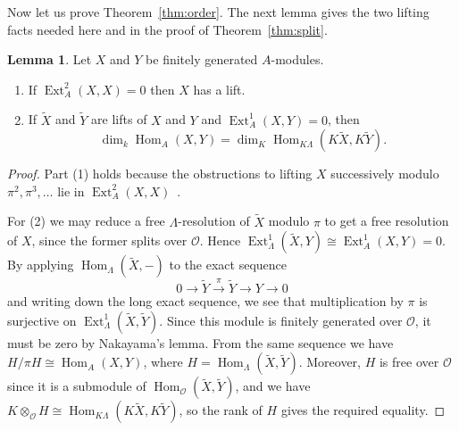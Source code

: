 \documentclass[11pt,a4paper,reqno]{amsart}
\newcommand{\kk}{k}
\theoremstyle{definition}
\newtheorem{lemma}[theorem]{Lemma}
\DeclareMathOperator{\Hom}{Hom}
\DeclareMathOperator{\Ext}{Ext}
\newcommand{\OO}{\mathcal O}
\newcommand{\tight}{\setlength{\itemsep}{0pt}\setlength{\parsep}{0pt}}
\begin{document}
Now let us prove Theorem~\ref{thm:order}.  The next lemma gives the
two lifting facts needed here and in the proof of
Theorem~\ref{thm:split}.

\begin{lemma}\label{lem:lift}
  Let $X$ and $Y$ be finitely generated $A$-modules.
  \begin{enumerate}\tight
  \item If $\Ext_{A}^{2}(X,X)=0$ then $X$ has a lift.
  \item If $\widetilde X$ and $\widetilde Y$ are lifts of $X$ and $Y$
    and $\Ext_{A}^{1}(X,Y)=0$, then
    \begin{equation*}
      \dim_{\kk}\Hom_{A}(X,Y)=\dim_{K}\Hom_{K\Lambda}(K\widetilde X,K\widetilde Y).
    \end{equation*}
  \end{enumerate}
\end{lemma}
\begin{proof}
  Part (1) holds because the obstructions to lifting $X$ successively
  modulo $\pi^{2},\pi^{3},\ldots$ lie in
  $\Ext_{A}^{2}(X,X)$~\cite[Proposition 1.6]{ADS}.

  For (2) we may reduce a free $\Lambda$-resolution of $\widetilde X$
  modulo $\pi$ to get a free resolution of $X$, since the former
  splits over $\OO$.  Hence
  $\Ext_{\Lambda}^{1}(\widetilde X,Y)\cong\Ext_{A}^{1}(X,Y)=0$.  By
  applying $\Hom_{\Lambda}(\widetilde X,-)$ to the exact sequence
  \begin{equation*}
    0\longrightarrow\widetilde Y\xrightarrow{\ \pi\ }\widetilde Y\longrightarrow Y\longrightarrow0
  \end{equation*}
  and writing down the long exact sequence, we see that multiplication
  by $\pi$ is surjective on
  $\Ext_{\Lambda}^{1}(\widetilde X,\widetilde Y)$.  Since this module
  is finitely generated over $\OO$, it must be zero by Nakayama's
  lemma.  From the same sequence we have $H/\pi H\cong\Hom_{A}(X,Y)$,
  where $H=\Hom_{\Lambda}(\widetilde X,\widetilde Y)$.  Moreover, $H$
  is free over $\OO$ since it is a submodule of
  $\Hom_{\OO}(\widetilde X,\widetilde Y)$, and we have
  $K\otimes_{\OO}H\cong\Hom_{K\Lambda}(K\widetilde X,K\widetilde Y)$,
  so the rank of $H$ gives the required equality.
\end{proof}
\end{document}
